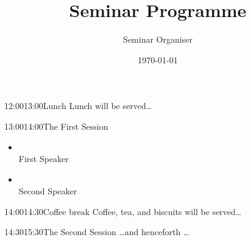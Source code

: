 \documentclass{programme}
\title{Seminar Programme}
\author{Seminar Organiser}
\date{\today}
\begin{document}
\maketitle

\begin{session}{12:00}{13:00}{Lunch}
  Lunch will be served\dots
\end{session}

\begin{session}{13:00}{14:00}{The First Session}
  \begin{itemize}
  \item {}\\First Speaker
  \item {}\\Second Speaker
  \end{itemize}
\end{session}

\begin{session}{14:00}{14:30}{Coffee break}
  Coffee, tea, and biscuits will be served\dots
\end{session}

\begin{session}{14:30}{15:30}{The Second Session}
  \dots and henceforth \dots
\end{session}

\end{document}
